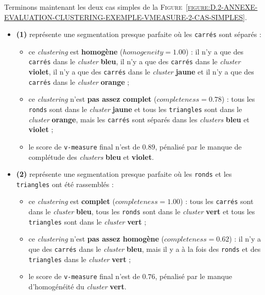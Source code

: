 		Terminons maintenant les deux cas simples de la \textsc{Figure~\ref{figure:D.2-ANNEXE-EVALUATION-CLUSTERING-EXEMPLE-VMEASURE-2-CAS-SIMPLES}}.
		\begin{itemize}
			\item \textbf{(1)} représente une segmentation presque parfaite où les \texttt{carrés} sont séparés :
			\begin{itemize}
				\item ce \textit{clustering} est \textbf{homogène} ($homogeneity=1.00$) : il n'y a que des \texttt{carrés} dans le \textit{cluster} \textbf{\textcolor{colorSilverLakeBlue}{bleu}}, il n'y a que des \texttt{carrés} dans le \textit{cluster} \textbf{\textcolor{colorDarkPastelPurple}{violet}}, il n'y a que des \texttt{carrés} dans le \textit{cluster} \textbf{\textcolor{colorMinionYellow}{jaune}} et il n'y a que des \texttt{carrés} dans le \textit{cluster} \textbf{\textcolor{colorCarrotOrange}{orange}} ;
				\item ce \textit{clustering} n'est \textbf{pas assez complet} ($completeness=0.78$) : tous les \texttt{ronds} sont dans le \textit{cluster} \textbf{\textcolor{colorMinionYellow}{jaune}} et tous les \texttt{triangles} sont dans le \textit{cluster} \textbf{\textcolor{colorCarrotOrange}{orange}}, mais les \texttt{carrés} sont séparés dans les \textit{clusters} \textbf{\textcolor{colorSilverLakeBlue}{bleu}} et \textbf{\textcolor{colorDarkPastelPurple}{violet}} ;
				\item le score de \texttt{v-measure} final n'est de $0.89$, pénalisé par le manque de complétude des \textit{clusters} \textbf{\textcolor{colorSilverLakeBlue}{bleu}} et \textbf{\textcolor{colorDarkPastelPurple}{violet}}.
			\end{itemize}
			\item \textbf{(2)} représente une segmentation presque parfaite où les \texttt{ronds} et les \texttt{triangles} ont été rassemblés :
			\begin{itemize}
				\item ce \textit{clustering} est \textbf{complet} ($completeness=1.00$) : tous les \texttt{carrés} sont dans le \textit{cluster} \textbf{\textcolor{colorSilverLakeBlue}{bleu}}, tous les \texttt{ronds} sont dans le \textit{cluster} \textbf{\textcolor{colorDarkPastelGreen}{vert}} et tous les \texttt{triangles} sont dans le \textit{cluster} \textbf{\textcolor{colorDarkPastelGreen}{vert}} ;
				\item ce \textit{clustering} n'est \textbf{pas assez homogène} ($completeness=0.62$) : il n'y a que des \texttt{carrés} dans le \textit{cluster} \textbf{\textcolor{colorSilverLakeBlue}{bleu}}, mais il y a à la fois des \texttt{ronds} et des \texttt{triangles} dans le \textit{cluster} \textbf{\textcolor{colorDarkPastelGreen}{vert}} ;
				\item le score de \texttt{v-measure} final n'est de $0.76$, pénalisé par le manque d'homogénéité du \textit{cluster} \textbf{\textcolor{colorDarkPastelGreen}{vert}}.
			\end{itemize}
		\end{itemize}
	
	